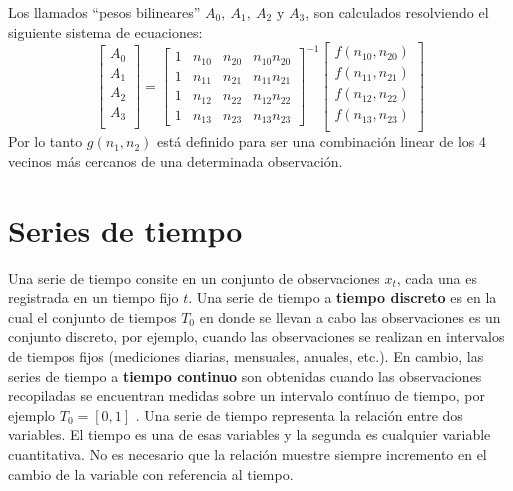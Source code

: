 Los llamados ``pesos bilineares''\cite{26} $A_0,~A_1,~A_2\text{ y }A_3$, son calculados resolviendo el siguiente sistema de ecuaciones:
\begin{equation}\label{interp2d}
    \begin{bmatrix}
        A_0 \\
        A_1 \\
        A_2 \\
        A_3 \\
    \end{bmatrix}
    =
    \begin{bmatrix}
        1 & n_{10} & n_{20} & n_{10}n_{20} \\
        1 & n_{11} & n_{21} & n_{11}n_{21} \\
        1 & n_{12} & n_{22} & n_{12}n_{22} \\
        1 & n_{13} & n_{23} & n_{13}n_{23} 
    \end{bmatrix}^{-1}
    \begin{bmatrix}
        f(n_{10},n_{20}) \\
        f(n_{11},n_{21}) \\
        f(n_{12},n_{22}) \\
        f(n_{13},n_{23}) \\
    \end{bmatrix}
\end{equation}
Por lo tanto $g(n_1,n_2)$ está definido para ser una combinación linear de los 4 vecinos más cercanos de una determinada observación.
%
%
%
%
\section{Series de tiempo}
Una serie de tiempo consite en un conjunto de observaciones $x_t$, cada una es registrada en un tiempo fijo $t$.
Una serie de tiempo a \textbf{tiempo discreto} es en la cual el conjunto de tiempos $T_0$ en donde se llevan a cabo las observaciones
es un conjunto discreto, por ejemplo, cuando las observaciones se realizan en intervalos de tiempos fijos (mediciones diarias, mensuales, anuales, etc.). 
En cambio, las series de tiempo a \textbf{tiempo continuo} son obtenidas cuando las observaciones recopiladas se encuentran medidas sobre un intervalo
contínuo de tiempo, por ejemplo $T_0=[0,1]$ \cite{21}. Una serie de tiempo representa la relación entre dos variables. El tiempo es una de esas variables 
y la segunda es cualquier variable cuantitativa. No es necesario que la relación muestre siempre incremento en el cambio de la variable con referencia al tiempo. 

